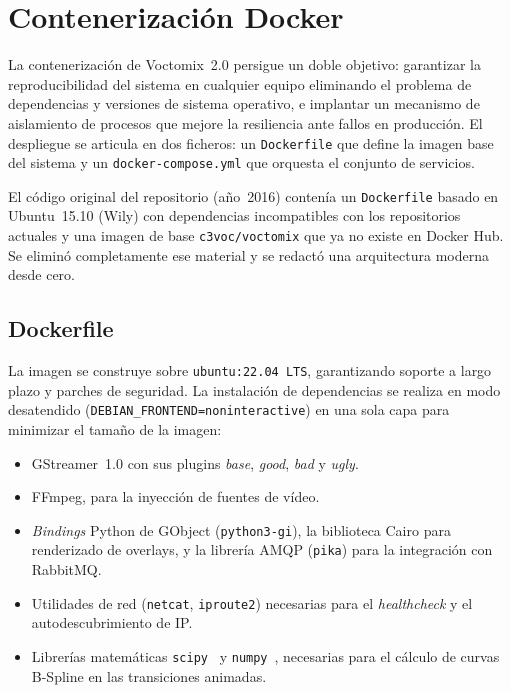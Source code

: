 \section{Contenerización Docker}
\label{sec:docker}

La contenerización de Voctomix~2.0 persigue un doble objetivo: garantizar la
reproducibilidad del sistema en cualquier equipo eliminando el problema de dependencias
y versiones de sistema operativo, e implantar un mecanismo de aislamiento de procesos
que mejore la resiliencia ante fallos en producción. El despliegue se articula en dos
ficheros: un \texttt{Dockerfile} que define la imagen base del sistema y un
\texttt{docker-compose.yml} que orquesta el conjunto de servicios.

El código original del repositorio (año~2016) contenía un \texttt{Dockerfile} basado
en Ubuntu~15.10 (Wily) con dependencias incompatibles con los repositorios actuales y
una imagen de base \texttt{c3voc/voctomix} que ya no existe en Docker Hub. Se eliminó
completamente ese material y se redactó una arquitectura moderna desde cero.

\subsection{Dockerfile}

La imagen se construye sobre \texttt{ubuntu:22.04~LTS}, garantizando soporte a largo
plazo y parches de seguridad. La instalación de dependencias se realiza en modo
desatendido (\texttt{DEBIAN\_FRONTEND=noninteractive}) en una sola capa para minimizar
el tamaño de la imagen:

\begin{itemize}
  \item GStreamer~1.0 con sus plugins \textit{base}, \textit{good}, \textit{bad} y
        \textit{ugly}.
  \item FFmpeg, para la inyección de fuentes de vídeo.
  \item \textit{Bindings} Python de GObject (\texttt{python3-gi}), la biblioteca Cairo
        para renderizado de overlays, y la librería AMQP (\texttt{pika}) para la
        integración con RabbitMQ.
  \item Utilidades de red (\texttt{netcat}, \texttt{iproute2}) necesarias para el
        \textit{healthcheck} y el autodescubrimiento de IP.
  \item Librerías matemáticas \texttt{scipy}~\cite{virtanen2020scipy} y \texttt{numpy}~\cite{harris2020numpy}, necesarias para el
        cálculo de curvas B-Spline en las transiciones animadas.
\end{itemize}

